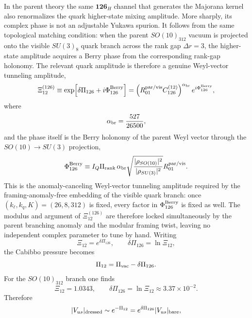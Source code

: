 \documentclass[11pt]{article}
\begin{document}
In the parent theory the same $\mathbf{126}_H$ channel that generates the Majorana kernel also renormalizes the quark higher-state mixing amplitude. More sharply, its complex phase is not an adjustable Yukawa spurion. It follows from the same topological matching condition: when the parent $SO(10)_{312}$ vacuum is projected onto the visible $SU(3)_8$ quark branch across the rank gap $\Delta r=3$, the higher-state amplitude acquires a Berry phase from the corresponding rank-gap holonomy. The relevant quark amplitude is therefore a genuine Weyl-vector tunneling amplitude,
\begin{equation}
 \Xi_{12}^{(126)}
 \equiv
 \exp\!\left[\delta\Pi_{126}+i\Phi_{126}^{\rm Berry}\right]
 =
 \left(R_{01}^{\rm par/vis}C_{126}^{(12)}\right)^{\alpha_{\rm br}}e^{i\Phi_{126}^{\rm Berry}},
\end{equation}
where
\begin{equation}
 \alpha_{\rm br}
 =
 \frac{527}{26500},
\end{equation}
and the phase itself is the Berry holonomy of the parent Weyl vector through the $SO(10)\to SU(3)$ projection,
\begin{equation}
 \Phi_{126}^{\rm Berry}
 \equiv
 I_Q\Pi_{\rm rank}\,\alpha_{\rm br}
 \sqrt{\frac{|\rho_{SO(10)}|^2}{|\rho_{SU(3)}|^2}}
 R_{01}^{\rm par/vis}.
\end{equation}
This is the anomaly-canceling Weyl-vector tunneling amplitude required by the framing-anomaly-free embedding of the visible quark branch: once $(k_{\ell},k_q,K)=(26,8,312)$ is fixed, every factor in $\Phi_{126}^{\rm Berry}$ is fixed as well. The modulus and argument of $\Xi_{12}^{(126)}$ are therefore locked simultaneously by the parent branching anomaly and the modular framing twist, leaving no independent complex parameter to tune by hand. Writing
\begin{equation}
 \Xi_{12} = e^{\delta\Pi_{126}},
 \qquad
 \delta\Pi_{126}=\ln\Xi_{12},
\end{equation}
the Cabibbo pressure becomes
\begin{equation}
 \Pi_{12}=\Pi_{\rm vac}-\delta\Pi_{126}.
\end{equation}
For the $SO(10)_{312}$ branch one finds
\begin{equation}
 \Xi_{12}=1.0343,
 \qquad
 \delta\Pi_{126}=\ln\Xi_{12}\approx3.37\times10^{-2}.
\end{equation}
Therefore
\begin{equation}
 |V_{us}|_{\rm dressed}
 \sim
 e^{-\Pi_{12}}
 = e^{\delta\Pi_{126}}|V_{us}|_{\rm bare},
\end{equation}
\end{document}
